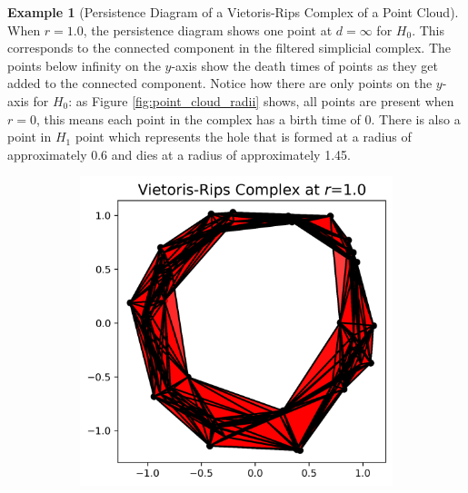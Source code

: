 \documentclass[ma]{uncgdissertationexp}
\theoremstyle{plain}
\theoremstyle{definition}
\newtheorem{example}[theorem]{Example}
\theoremstyle{remark}
\begin{document}
\begin{example}[Persistence Diagram of a Vietoris-Rips Complex of a Point Cloud]
When $r=1.0$, the persistence diagram shows one point at $d=\infty$ for $H_0$. This corresponds to the connected component in the filtered simplicial complex. The points below infinity on the $y$-axis show the death times of points as they get added to the connected component. Notice how there are only points on the $y$-axis for $H_{0}$: as Figure \ref{fig:point_cloud_radii} shows, all points are present when $r=0$, this means each point in the complex has a birth time of $0$. There is also a point in $H_{1}$ point which represents the hole that is formed at a radius of approximately 0.6 and dies at a radius of approximately 1.45.
\begin{figure}[H]
    \centering
    \begin{subfigure}[b]{0.45\textwidth}
        \centering
        \includegraphics[width=\textwidth]{point_cloud_plot_r1_0.png}
    \end{subfigure}
    \hfill
    \begin{subfigure}[b]{0.45\textwidth}
        \centering

\end{subfigure}
\end{figure}
\end{example}
\end{document}
